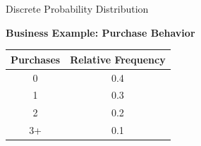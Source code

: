 \documentclass{beamer}
\begin{document}
\begin{frame}{Discrete Probability Distribution}

\textbf{Business Example: Purchase Behavior}

\begin{center}
\begin{tabular}{c|c}
Purchases & Relative Frequency \\
\hline
0 & 0.4 \\
1 & 0.3 \\
2 & 0.2 \\
3+ & 0.1
\end{tabular}
\end{center}

\vspace{0.25cm}






\end{frame}

%






%

%
\end{document}

